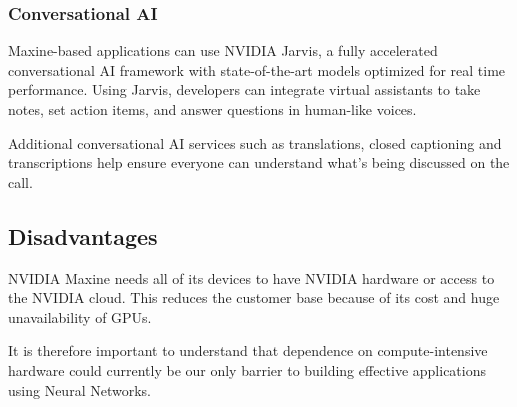 \subsubsection{Conversational AI}
Maxine-based applications can use NVIDIA Jarvis, a fully accelerated conversational
AI framework with state-of-the-art models optimized for real time performance. Using Jarvis, 
developers can integrate virtual assistants to take notes, set action items, and answer questions 
in human-like voices.

Additional conversational AI services such as translations, closed captioning and transcriptions help 
ensure everyone can understand what’s being discussed on the call.

\subsection{Disadvantages}

NVIDIA Maxine needs all of its devices to have NVIDIA hardware or access to the NVIDIA cloud. 
This reduces the customer base because of its cost and huge unavailability of GPUs.

It is therefore important to understand that dependence on compute-intensive hardware could
currently be our only barrier to building effective applications using Neural Networks.
